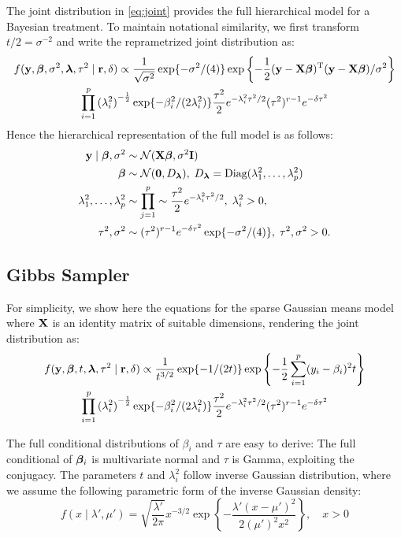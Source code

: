\documentclass[11pt]{article}
\begin{document}
The joint distribution in \eqref{eq:joint} provides the full hierarchical model for a Bayesian treatment. To maintain notational similarity, we first transform $t/2 = \sigma^{-2}$ and write the 
reprametrized joint distribution as: 
\begin{multline}
f({\bf y}, \boldsymbol{\beta}, \sigma^2, \boldsymbol{\lambda}, \tau^2 \mid {\bf r}, \delta) \propto 
\frac{1}{\sqrt{\sigma^2}} \exp\{-{\sigma^2}/({4}) \} \exp \left\{- \frac{1}{2} ({\bf y} - {\bf X} \boldsymbol{\beta})^{{\rm T}}({\bf y} - {\bf X} \boldsymbol{\beta})/ \sigma^2 \right\} \\
\prod_{i=1}^{p} {(\lambda_i^2)}^{-\frac{1}{2}} \exp\{-\beta_i^2/(2\lambda_i^2)\} \frac{\tau^2}{2} e^{-\lambda_i^2\tau^2/2} (\tau^2)^{r-1} e^{-\delta \tau^2} \label{eq:joint}
\end{multline}
Hence the hierarchical representation of the full model is as follows:
\begin{align}
{\bf y} \mid \boldsymbol{\beta}, \sigma^2 & \sim \mathcal{N}({\bf X} \boldsymbol{\beta}, \sigma^2 {\bf I}) \\
\boldsymbol{\beta} & \sim \mathcal{N}({\bf 0}, D_{\boldsymbol{\lambda}}), \; D_{\boldsymbol{\lambda}} = \text{Diag}(\lambda_1^2, \ldots, \lambda_p^2) \\
\lambda_1^2, \ldots, \lambda_p^2 & \sim \prod_{j=1}^{p} \sim \frac{\tau^2}{2} e^{-\lambda_i^2\tau^2/2}, \; \lambda_i^2 > 0, \\
\tau^2, \sigma^2 & \sim (\tau^2)^{r-1} e^{-\delta \tau^2} \exp\{-{\sigma^2}/({4}) \}, \; \tau^2, \sigma^2 > 0. 
\end{align}


\subsection{Gibbs Sampler}

For simplicity, we show here the equations for the sparse Gaussian means model where ${\bf X}$ is an identity matrix of suitable dimensions, rendering the joint distribution as:
\begin{multline}
f({\bf y}, \boldsymbol{\beta}, t, \boldsymbol{\lambda}, \tau^2 \mid {\bf r}, \delta) \propto 
\frac{1}{t^{3/2}} \exp\{-{1}/({2 t}) \} \exp \left\{- \frac{1}{2} \sum_{i=1}^{p}(y_i-\beta_i)^2 t \right\} \\
\prod_{i=1}^{p} {(\lambda_i^2)}^{-\frac{1}{2}} \exp\{-\beta_i^2/(2\lambda_i^2)\} \frac{\tau^2}{2} e^{-\lambda_i^2\tau^2/2} (\tau^2)^{r-1} e^{-\delta \tau^2} \label{eq:joint}
\end{multline}

The full conditional distributions of $\beta_i$ and $\tau$ are easy to derive: The full conditional of $\boldsymbol{\beta}_i$ is multivariate normal and $\tau$ is Gamma, exploiting the conjugacy. The parameters $t$ and $\lambda_i^2$ follow inverse Gaussian distribution, where we assume the following parametric form of the inverse Gaussian density:
\[
f(x \mid \lambda', \mu') = \sqrt{\frac{\lambda'}{2\pi}} x^{-3/2} \exp\left\{ - \frac{\lambda'(x-\mu')^2}{2(\mu')^2 x^2} \right \}, \quad x > 0 
\]
\end{document}
